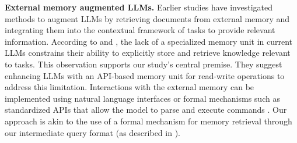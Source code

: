 \noindent \textbf{External memory augmented LLMs.} Earlier studies have investigated methods to augment LLMs by retrieving documents from external memory and integrating them into the contextual framework of tasks to provide relevant information.
According to \citet{retllm} and \citet{memllm}, the lack of a specialized memory unit in current LLMs constrains their ability to explicitly store and retrieve knowledge relevant to tasks. This observation supports our study's central premise. They suggest enhancing LLMs with an API-based memory unit for read-write operations to address this limitation.
Interactions with the external memory can be implemented using natural language interfaces \citep{park2023generative, zhou2023recurrentgpt} or formal mechanisms such as standardized APIs that allow the model to parse and execute commands \citep{toolformer, hu2023chatdb, retllm, memllm}.
Our approach is akin to the use of a formal mechanism for memory retrieval through our intermediate query format (as described in ).

